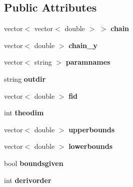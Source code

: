 \subsection*{Public Attributes}
\begin{DoxyCompactItemize}
\item 
\hypertarget{classDaliPaint_a52d99f22afec8f3e1832b9f405400d4a}{vector$<$ vector$<$ double $>$ $>$ {\bfseries chain}}\label{classDaliPaint_a52d99f22afec8f3e1832b9f405400d4a}

\item 
\hypertarget{classDaliPaint_a7d24971d1939a4477362b686ae19c0a7}{vector$<$ double $>$ {\bfseries chain\-\_\-y}}\label{classDaliPaint_a7d24971d1939a4477362b686ae19c0a7}

\item 
\hypertarget{classDaliPaint_ac03f1785efbf019e44d30afb75ffa8be}{vector$<$ string $>$ {\bfseries paramnames}}\label{classDaliPaint_ac03f1785efbf019e44d30afb75ffa8be}

\item 
\hypertarget{classDaliPaint_a6cc54c082cae691363f15ceb4f6036a8}{string {\bfseries outdir}}\label{classDaliPaint_a6cc54c082cae691363f15ceb4f6036a8}

\item 
\hypertarget{classDaliPaint_ac8d20853c9c350d347ff802da10791f1}{vector$<$ double $>$ {\bfseries fid}}\label{classDaliPaint_ac8d20853c9c350d347ff802da10791f1}

\item 
\hypertarget{classDaliPaint_a4933671dff1c6ae9c4f78d09d0916369}{int {\bfseries theodim}}\label{classDaliPaint_a4933671dff1c6ae9c4f78d09d0916369}

\item 
\hypertarget{classDaliPaint_aa451271daf85ef2aefc4a455603196fe}{vector$<$ double $>$ {\bfseries upperbounds}}\label{classDaliPaint_aa451271daf85ef2aefc4a455603196fe}

\item 
\hypertarget{classDaliPaint_a524e6ea9f6be8d9a746a9ddc01c2e5ed}{vector$<$ double $>$ {\bfseries lowerbounds}}\label{classDaliPaint_a524e6ea9f6be8d9a746a9ddc01c2e5ed}

\item 
\hypertarget{classDaliPaint_a9bba1a18975c0f16547d68d5fa2b491e}{bool {\bfseries boundsgiven}}\label{classDaliPaint_a9bba1a18975c0f16547d68d5fa2b491e}

\item 
\hypertarget{classDaliPaint_a11ecaa214f7bfd4fbb4b84b24811744d}{int {\bfseries derivorder}}\label{classDaliPaint_a11ecaa214f7bfd4fbb4b84b24811744d}


\end{DoxyCompactItemize}
